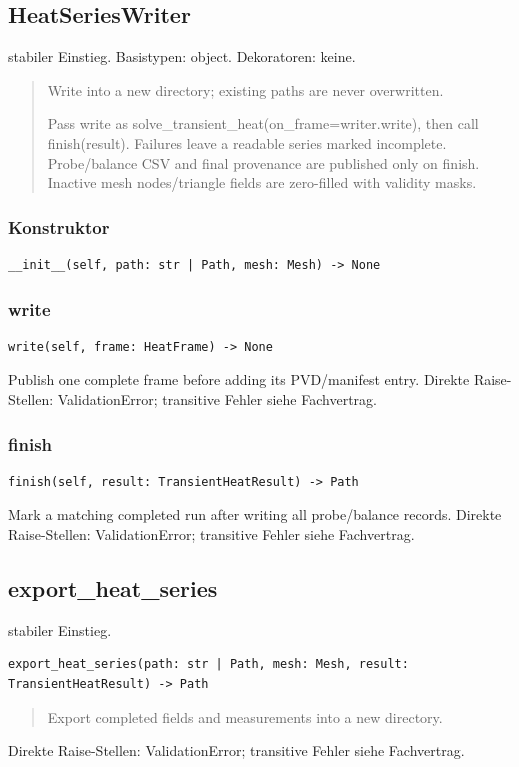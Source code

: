 \subsection{HeatSeriesWriter}
stabiler Einstieg.
Basistypen: object. Dekoratoren: keine.
\begin{quote}
Write into a new directory; existing paths are never overwritten.\par Pass write as solve\_transient\_heat(on\_frame=writer.write), then call finish(result). Failures leave a readable series marked incomplete. Probe/balance CSV and final provenance are published only on finish. Inactive mesh nodes/triangle fields are zero-filled with validity masks.
\end{quote}
\subsubsection*{Konstruktor}
\begin{lstlisting}
__init__(self, path: str | Path, mesh: Mesh) -> None
\end{lstlisting}
\subsubsection*{write}
\begin{lstlisting}
write(self, frame: HeatFrame) -> None
\end{lstlisting}
Publish one complete frame before adding its PVD/manifest entry.
Direkte Raise-Stellen: ValidationError; transitive Fehler siehe Fachvertrag.
\subsubsection*{finish}
\begin{lstlisting}
finish(self, result: TransientHeatResult) -> Path
\end{lstlisting}
Mark a matching completed run after writing all probe/balance records.
Direkte Raise-Stellen: ValidationError; transitive Fehler siehe Fachvertrag.
\subsection{export\_heat\_series}
stabiler Einstieg.
\begin{lstlisting}
export_heat_series(path: str | Path, mesh: Mesh, result: TransientHeatResult) -> Path
\end{lstlisting}
\begin{quote}
Export completed fields and measurements into a new directory.
\end{quote}
Direkte Raise-Stellen: ValidationError; transitive Fehler siehe Fachvertrag.
